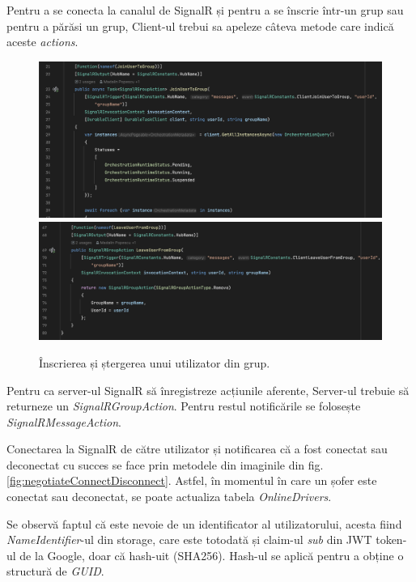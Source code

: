 Pentru a se conecta la canalul de SignalR și pentru a se înscrie într-un grup sau pentru
a părăsi un grup, Client-ul trebui sa apeleze câteva metode care indică aceste \textit{actions}.

\begin{figure}[H]
    \centering
    \includegraphics[width=16cm]{Assets/JoinUser.png}
    \includegraphics[width=16cm]{Assets/RemoveUser.png}
    \caption{Înscrierea și ștergerea unui utilizator din grup.}
    \label{fig:JoinRemoveUser}
\end{figure}

Pentru ca server-ul SignalR să înregistreze acțiunile aferente, Server-ul
trebuie să returneze un \textit{SignalRGroupAction}. Pentru restul notificările
se folosește \textit{SignalRMessageAction}.

Conectarea la SignalR de către utilizator și notificarea că a fost conectat sau
deconectat cu succes se face prin metodele din imaginile din fig. \ref{fig:negotiateConnectDisconnect}.
Astfel, în momentul în care un șofer este conectat sau deconectat, se poate actualiza
tabela \textit{OnlineDrivers}.

Se observă faptul că este nevoie de un identificator al utilizatorului, acesta fiind \textit{NameIdentifier}-ul
din storage, care este totodată și claim-ul \textit{sub} din JWT token-ul de la Google, doar că hash-uit (SHA256).
Hash-ul se aplică pentru a obține o structură de \textit{GUID}.

